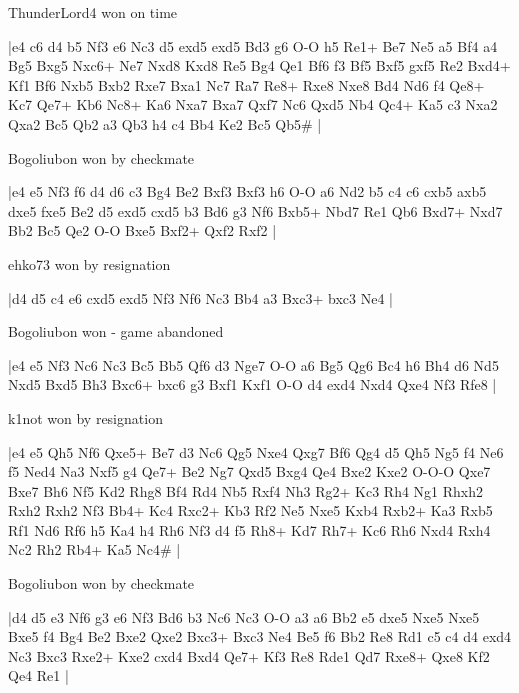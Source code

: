 \showboard

ThunderLord4 won on time

\makegametitle
|e4 c6 d4 b5 Nf3 e6 Nc3 d5 exd5 exd5 Bd3 g6 O-O h5 Re1+ Be7 Ne5 a5 Bf4 a4 Bg5 Bxg5 Nxc6+ Ne7 Nxd8 Kxd8 Re5 Bg4 Qe1 Bf6 f3 Bf5 Bxf5 gxf5 Re2 Bxd4+ Kf1 Bf6 Nxb5 Bxb2 Rxe7 Bxa1 Nc7 Ra7 Re8+ Rxe8 Nxe8 Bd4 Nd6 f4 Qe8+ Kc7 Qe7+ Kb6 Nc8+ Ka6 Nxa7 Bxa7 Qxf7 Nc6 Qxd5 Nb4 Qc4+ Ka5 c3 Nxa2 Qxa2 Bc5 Qb2 a3 Qb3 h4 c4 Bb4 Ke2 Bc5 Qb5\#  |

\showboard

Bogoliubon won by checkmate

\makegametitle
|e4 e5 Nf3 f6 d4 d6 c3 Bg4 Be2 Bxf3 Bxf3 h6 O-O a6 Nd2 b5 c4 c6 cxb5 axb5 dxe5 fxe5 Be2 d5 exd5 cxd5 b3 Bd6 g3 Nf6 Bxb5+ Nbd7 Re1 Qb6 Bxd7+ Nxd7 Bb2 Bc5 Qe2 O-O Bxe5 Bxf2+ Qxf2 Rxf2  |

\showboard

ehko73 won by resignation

\makegametitle
|d4 d5 c4 e6 cxd5 exd5 Nf3 Nf6 Nc3 Bb4 a3 Bxc3+ bxc3 Ne4  |

\showboard

Bogoliubon won - game abandoned

\makegametitle
|e4 e5 Nf3 Nc6 Nc3 Bc5 Bb5 Qf6 d3 Nge7 O-O a6 Bg5 Qg6 Bc4 h6 Bh4 d6 Nd5 Nxd5 Bxd5 Bh3 Bxc6+ bxc6 g3 Bxf1 Kxf1 O-O d4 exd4 Nxd4 Qxe4 Nf3 Rfe8  |

\showboard

k1not won by resignation

\makegametitle
|e4 e5 Qh5 Nf6 Qxe5+ Be7 d3 Nc6 Qg5 Nxe4 Qxg7 Bf6 Qg4 d5 Qh5 Ng5 f4 Ne6 f5 Ned4 Na3 Nxf5 g4 Qe7+ Be2 Ng7 Qxd5 Bxg4 Qe4 Bxe2 Kxe2 O-O-O Qxe7 Bxe7 Bh6 Nf5 Kd2 Rhg8 Bf4 Rd4 Nb5 Rxf4 Nh3 Rg2+ Kc3 Rh4 Ng1 Rhxh2 Rxh2 Rxh2 Nf3 Bb4+ Kc4 Rxc2+ Kb3 Rf2 Ne5 Nxe5 Kxb4 Rxb2+ Ka3 Rxb5 Rf1 Nd6 Rf6 h5 Ka4 h4 Rh6 Nf3 d4 f5 Rh8+ Kd7 Rh7+ Kc6 Rh6 Nxd4 Rxh4 Nc2 Rh2 Rb4+ Ka5 Nc4\#  |

\showboard

Bogoliubon won by checkmate

\makegametitle
|d4 d5 e3 Nf6 g3 e6 Nf3 Bd6 b3 Nc6 Nc3 O-O a3 a6 Bb2 e5 dxe5 Nxe5 Nxe5 Bxe5 f4 Bg4 Be2 Bxe2 Qxe2 Bxc3+ Bxc3 Ne4 Be5 f6 Bb2 Re8 Rd1 c5 c4 d4 exd4 Nc3 Bxc3 Rxe2+ Kxe2 cxd4 Bxd4 Qe7+ Kf3 Re8 Rde1 Qd7 Rxe8+ Qxe8 Kf2 Qe4 Re1  |

